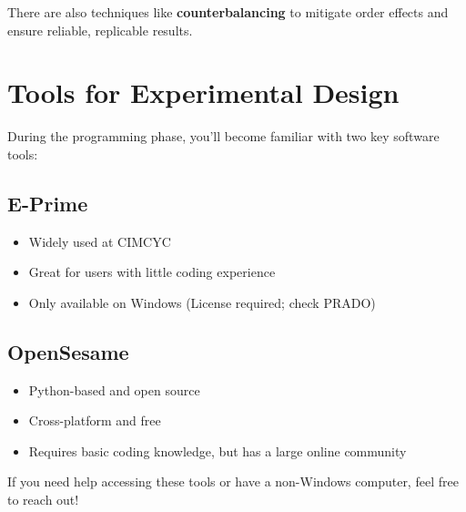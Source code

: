 \documentclass[
  letterpaper,
  DIV=11,
  numbers=noendperiod]{scrreprt}
\providecommand{\tightlist}{%
  \setlength{\itemsep}{0pt}\setlength{\parskip}{0pt}}\usepackage{longtable,booktabs,array}
\begin{document}
There are also techniques like \textbf{counterbalancing} to mitigate
order effects and ensure reliable, replicable results.

\hypertarget{tools-for-experimental-design}{%
\section{Tools for Experimental
Design}\label{tools-for-experimental-design}}

During the programming phase, you'll become familiar with two key
software tools:

\hypertarget{e-prime}{%
\subsection{E-Prime}\label{e-prime}}

\begin{itemize}
\tightlist
\item
  Widely used at CIMCYC
\item
  Great for users with little coding experience
\item
  Only available on Windows (License required; check PRADO)
\end{itemize}

\hypertarget{opensesame}{%
\subsection{OpenSesame}\label{opensesame}}

\begin{itemize}
\tightlist
\item
  Python-based and open source
\item
  Cross-platform and free
\item
  Requires basic coding knowledge, but has a large online community
\end{itemize}

If you need help accessing these tools or have a non-Windows computer,
feel free to reach out!
\end{document}
